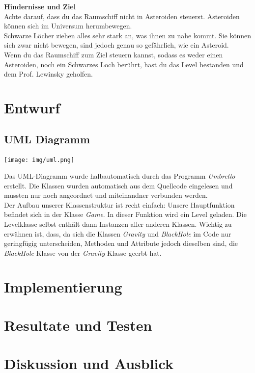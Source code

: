 \documentclass[12pt,a4paper]{scrartcl}
\newcommand{\inmilestonetwo}{\vspace{0.75cm} \framebox[1.1\width]{
\begin{large}
\textcolor{red}{Die Dokumentation dieses Abschnittes ist für Milestone II vorgesehen.}
\end{large}}}
\begin{document}
\textbf{Hindernisse und Ziel}\\
Achte darauf, dass du das Raumschiff nicht in Asteroiden steuerst. Asteroiden können sich im Universum herumbewegen.\\
Schwarze Löcher ziehen alles sehr stark an, was ihnen zu nahe kommt. Sie können sich zwar nicht bewegen, sind jedoch genau so gefährlich, wie ein Asteroid.\\
Wenn du das Raumschiff zum Ziel steuern kannst, sodass es weder einen Asteroiden, noch ein Schwarzes Loch berührt, hast du das Level bestanden und dem Prof. Lewinsky geholfen.

\clearpage
\newpage
\section{Entwurf}
\subsection{UML Diagramm}
\vspace{0.3cm}
\texttt{[image: img/uml.png]}

Das UML-Diagramm wurde halbautomatisch durch das Programm \textit{Umbrello} erstellt. Die Klassen
wurden automatisch aus dem Quellcode eingelesen und mussten nur noch angeordnet und miteinandner verbunden
werden.\\

Der Aufbau unserer Klassenstruktur ist recht einfach: Unsere Hauptfunktion befindet sich in der Klasse
\textit{Game}. In dieser Funktion wird ein Level geladen. Die Levelklasse selbst enthält dann
Instanzen aller anderen Klassen. Wichtig zu erwähnen ist, dass, da sich die Klassen \textit{Gravity}
und \textit{BlackHole} im Code nur geringfügig unterscheiden, Methoden und Attribute jedoch dieselben sind,
die \textit{BlackHole}-Klasse von der \textit{Gravity}-Klasse geerbt hat.


\section{Implementierung}

\fontsize{12pt}{14pt}\selectfont

\section{Resultate und Testen}
\inmilestonetwo
\section{Diskussion und Ausblick}
\inmilestonetwo
\end{document}

